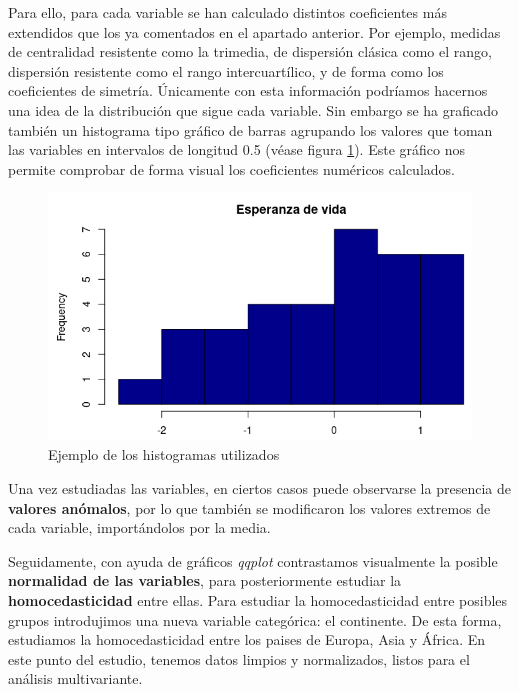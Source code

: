 \documentclass[letterpaper,11pt]{article}
\begin{document}
Para ello, para cada variable se han calculado distintos coeficientes más extendidos que los ya comentados en el apartado anterior. Por ejemplo, medidas de centralidad resistente como la trimedia, de dispersión clásica como el rango, dispersión resistente como el rango intercuartílico, y de forma como los coeficientes de simetría. Únicamente con esta información podríamos hacernos una idea de la distribución que sigue cada variable. Sin embargo se ha graficado también un histograma tipo gráfico de barras agrupando los valores que toman las variables en intervalos de longitud 0.5 (véase figura \ref{histograma}). Este gráfico nos permite comprobar de forma visual los coeficientes numéricos calculados. 

\begin{figure}
\begin{center}
\includegraphics[scale=0.4]{./img/histograma.png}
\end{center}
\caption{Ejemplo de los histogramas utilizados}
\label{histograma}
\end{figure}

Una vez estudiadas las variables, en ciertos casos puede observarse la presencia de \textbf{valores anómalos}, por lo que también se modificaron los valores extremos de cada variable, importándolos por la media.

Seguidamente, con ayuda de gráficos \textit{qqplot} contrastamos visualmente la posible \textbf{normalidad de las variables}, para posteriormente estudiar la \textbf{homocedasticidad} entre ellas. Para estudiar la homocedasticidad entre posibles grupos introdujimos una nueva variable categórica: el continente. De esta forma, estudiamos la homocedasticidad entre los paises de Europa, Asia y África. En este punto del estudio, tenemos datos limpios y normalizados, listos para el análisis multivariante. 
\end{document}
